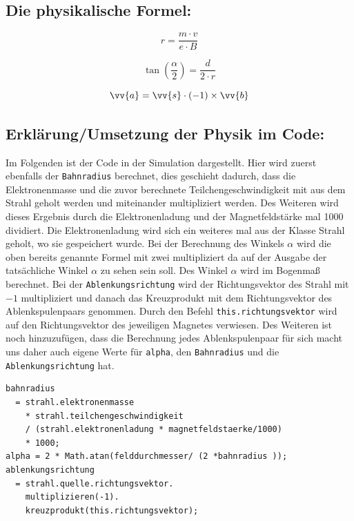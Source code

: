 \subsection{Die physikalische Formel:}
\begin{equation}
     \label{eq:r}
     r = \frac{m \cdot v}{e \cdot B}
\end{equation}

\begin{equation}
    \label{eq:tan}
    \tan(\frac{\alpha}{2}) = \frac{d}{2 \cdot r}
\end{equation}

\begin{equation}
    \label{eq:a}
    \vv{a} = \vv{s} \cdot (-1) \times \vv{b}
\end{equation}

\subsection{Erklärung/Umsetzung der Physik im Code:}

Im Folgenden ist der Code in der Simulation dargestellt. Hier wird zuerst ebenfalls der \lstinline$Bahnradius$ berechnet, dies geschieht dadurch, dass die Elektronenmasse und die zuvor berechnete Teilchengeschwindigkeit mit aus dem Strahl geholt werden und miteinander multipliziert werden. Des Weiteren wird dieses Ergebnis durch die Elektronenladung und der Magnetfeldstärke mal 1000 dividiert. Die Elektronenladung wird sich ein weiteres mal aus der Klasse Strahl geholt, wo sie gespeichert wurde. Bei der Berechnung des Winkels $\alpha$ wird die oben %
bereits genannte Formel mit zwei multipliziert da auf der Ausgabe der tatsächliche Winkel $\alpha$ zu sehen sein soll. Des Winkel $\alpha$ wird im Bogenmaß berechnet. Bei der \lstinline$Ablenkungsrichtung$ wird der Richtungsvektor des Strahl mit $-1$ multipliziert und danach das Kreuzprodukt mit dem Richtungsvektor des Ablenkspulenpaars genommen. Durch den Befehl \lstinline$this.richtungsvektor$ wird auf den Richtungsvektor des jeweiligen Magnetes verwiesen. Des Weiteren ist noch hinzuzufügen, dass die Berechnung jedes Ablenkspulenpaar für sich macht uns daher auch eigene Werte für \lstinline$alpha$, den \lstinline$Bahnradius$ und die \lstinline$Ablenkungsrichtung$ hat.
\begin{lstlisting}
bahnradius
  = strahl.elektronenmasse
    * strahl.teilchengeschwindigkeit
    / (strahl.elektronenladung * magnetfeldstaerke/1000)
    * 1000;
alpha = 2 * Math.atan(felddurchmesser/ (2 *bahnradius ));
ablenkungsrichtung
  = strahl.quelle.richtungsvektor.
    multiplizieren(-1).
    kreuzprodukt(this.richtungsvektor);
\end{lstlisting}

